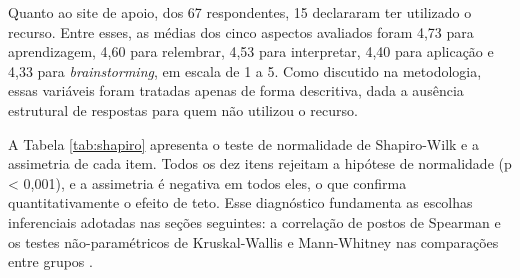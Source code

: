 \begin{table}[h!]
\centering
\captionsetup{width=15cm}
\caption{Médias das variáveis-núcleo por coorte}
\label{tab:medias-coorte}
\end{table}

\FloatBarrier

Quanto ao site de apoio, dos 67 respondentes, 15 declararam ter utilizado o recurso. Entre esses, as médias dos cinco aspectos avaliados foram 4,73 para aprendizagem, 4,60 para relembrar, 4,53 para interpretar, 4,40 para aplicação e 4,33 para \textit{brainstorming}, em escala de 1 a 5. Como discutido na metodologia, essas variáveis foram tratadas apenas de forma descritiva, dada a ausência estrutural de respostas para quem não utilizou o recurso.

A Tabela \ref{tab:shapiro} apresenta o teste de normalidade de Shapiro-Wilk e a assimetria de cada item. Todos os dez itens rejeitam a hipótese de normalidade (p < 0,001), e a assimetria é negativa em todos eles, o que confirma quantitativamente o efeito de teto. Esse diagnóstico fundamenta as escolhas inferenciais adotadas nas seções seguintes: a correlação de postos de Spearman e os testes não-paramétricos de Kruskal-Wallis e Mann-Whitney nas comparações entre grupos \cite{field2018}.

